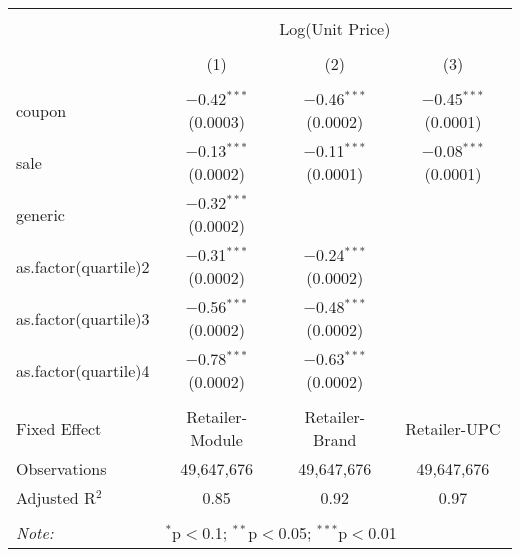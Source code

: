 
\begin{table}[!htbp] \centering 
  \caption{} 
  \label{tab:overallSavings} 
\begin{tabular}{@{\extracolsep{5pt}}lccc} 
\\[-1.8ex]\hline 
\hline \\[-1.8ex] 
 & \multicolumn{3}{c}{Log(Unit Price)} \\ 
\\[-1.8ex] & (1) & (2) & (3)\\ 
\hline \\[-1.8ex] 
 coupon & $-$0.42$^{***}$ (0.0003) & $-$0.46$^{***}$ (0.0002) & $-$0.45$^{***}$ (0.0001) \\ 
  sale & $-$0.13$^{***}$ (0.0002) & $-$0.11$^{***}$ (0.0001) & $-$0.08$^{***}$ (0.0001) \\ 
  generic & $-$0.32$^{***}$ (0.0002) &  &  \\ 
  as.factor(quartile)2 & $-$0.31$^{***}$ (0.0002) & $-$0.24$^{***}$ (0.0002) &  \\ 
  as.factor(quartile)3 & $-$0.56$^{***}$ (0.0002) & $-$0.48$^{***}$ (0.0002) &  \\ 
  as.factor(quartile)4 & $-$0.78$^{***}$ (0.0002) & $-$0.63$^{***}$ (0.0002) &  \\ 
 \hline \\[-1.8ex] 
Fixed Effect & Retailer-Module & Retailer-Brand & Retailer-UPC \\ 
Observations & 49,647,676 & 49,647,676 & 49,647,676 \\ 
Adjusted R$^{2}$ & 0.85 & 0.92 & 0.97 \\ 
\hline 
\hline \\[-1.8ex] 
\textit{Note:}  & \multicolumn{3}{l}{$^{*}$p$<$0.1; $^{**}$p$<$0.05; $^{***}$p$<$0.01} \\ 
\end{tabular} 
\end{table} 
